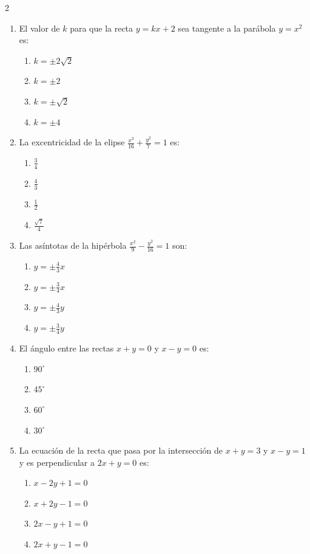 \documentclass[10pt]{article}
\begin{document}
\begin{multicols}{2}
\begin{enumerate}
\item El valor de $k$ para que la recta $y = kx + 2$ sea tangente a la parábola $y = x^2$ es:
\begin{enumerate}[label=(\alph*)]
\item $k = \pm 2\sqrt{2}$
\item $k = \pm 2$
\item $k = \pm \sqrt{2}$
\item $k = \pm 4$
\end{enumerate}

\item La excentricidad de la elipse $\frac{x^2}{16} + \frac{y^2}{7} = 1$ es:
\begin{enumerate}[label=(\alph*)]
\item $\frac{3}{4}$
\item $\frac{4}{3}$
\item $\frac{1}{2}$
\item $\frac{\sqrt{7}}{4}$
\end{enumerate}

\item Las asíntotas de la hipérbola $\frac{x^2}{9} - \frac{y^2}{16} = 1$ son:
\begin{enumerate}[label=(\alph*)]
\item $y = \pm \frac{4}{3}x$
\item $y = \pm \frac{3}{4}x$
\item $y = \pm \frac{4}{3}y$
\item $y = \pm \frac{3}{4}y$
\end{enumerate}

\item El ángulo entre las rectas $x + y = 0$ y $x - y = 0$ es:
\begin{enumerate}[label=(\alph*)]
\item $90^\circ$
\item $45^\circ$
\item $60^\circ$
\item $30^\circ$
\end{enumerate}

\item La ecuación de la recta que pasa por la intersección de $x+y=3$ y $x-y=1$ y es perpendicular a $2x+y=0$ es:
\begin{enumerate}[label=(\alph*)]
\item $x-2y+1=0$
\item $x+2y-1=0$
\item $2x-y+1=0$
\item $2x+y-1=0$
\end{enumerate}


\end{enumerate}
\end{multicols}
\end{document}
